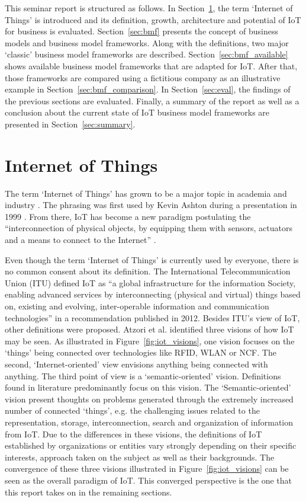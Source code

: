 	This seminar report is structured as follows. In Section~\ref{sec:iot}, the term `Internet of Things' is introduced and its definition, growth, architecture and potential of IoT for business is evaluated. Section~\ref{sec:bmf} presents the concept of business models and business model frameworks. Along with the definitions, two major `classic' business model frameworks are described. Section~\ref{sec:bmf_available} shows available business model frameworks that are adapted for IoT. After that, those frameworks are compared using a fictitious company as an illustrative example in Section~\ref{sec:bmf_comparison}. In Section~\ref{sec:eval}, the findings of the previous sections are evaluated. Finally, a summary of the report as well as a conclusion about the current state of IoT business model frameworks are presented in Section~\ref{sec:summary}. 
 
\section{Internet of Things}
\label{sec:iot}
	The term `Internet of Things' has grown to be a major topic in academia and industry \cite{ju}. The phrasing was first used by Kevin Ashton during a presentation in 1999 . From there, IoT has become a new paradigm postulating the ``interconnection of physical objects, by equipping them with sensors, actuators and a means to connect to the Internet'' \cite{dijkman} .

	Even though the term `Internet of Things' is currently used by everyone, there is no common consent about its definition. The International Telecommunication Union (ITU) defined IoT as ``a global infrastructure for the information Society, enabling advanced services by interconnecting (physical and virtual) things based on, existing and evolving, inter-operable information and communication technologies'' \cite{itu} in a recommendation published in 2012. Besides ITU's view of IoT, other definitions were proposed. Atzori et al. \cite{atzori} identified three visions of how IoT may be seen. As illustrated in Figure~\ref{fig:iot_visions}, one vision focuses on the `things' being connected over technologies like RFID, WLAN or NCF. The second, `Internet-oriented' view envisions anything being connected with anything. The third point of view is a `semantic-oriented' vision. Definitions found in literature predominantly focus on this vision. The `Semantic-oriented' vision present thoughts on problems generated through the extremely increased number of connected `things', e.g. the challenging issues related to the representation, storage, interconnection, search and organization of information from IoT. Due to the differences in these visions, the definitions of IoT established by organizations or entities vary strongly depending on their specific interests, approach taken on the subject as well as their backgrounds. The convergence of these three visions illustrated in Figure~\ref{fig:iot_visions} can be seen as the overall paradigm of IoT. This converged perspective is the one that this report takes on in the remaining sections. 

